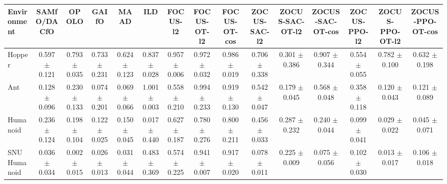 \begin{tabular}{lcccccccccccccc}
\toprule
Environment & SAMfO/DACfO & OPOLO & GAIfO & MAAD & ILD & FOCUS-l2 & FOCUS-OT-l2 & FOCUS-OT-cos & ZOCUS-SAC-l2 & ZOCUS-SAC-OT-l2 & ZOCUS-SAC-OT-cos & ZOCUS-PPO-l2 & ZOCUS-PPO-OT-l2 & ZOCUS-PPO-OT-cos \\
\midrule
Hopper & 0.597 $\pm$ 0.121 & 0.793 $\pm$ 0.035 & 0.733 $\pm$ 0.231 & 0.624 $\pm$ 0.123 & 0.837 $\pm$ 0.028 & 0.957 $\pm$ 0.006 & 0.972 $\pm$ 0.032 & 0.986 $\pm$ 0.019 & 0.706 $\pm$ 0.338 & 0.301 $\pm$ 0.386 & 0.907 $\pm$ 0.344 & 0.554 $\pm$ 0.055 & 0.782 $\pm$ 0.100 & 0.632 $\pm$ 0.198 \\
Ant & 0.128 $\pm$ 0.096 & 0.230 $\pm$ 0.133 & 0.074 $\pm$ 0.201 & 0.069 $\pm$ 0.066 & 1.001 $\pm$ 0.003 & 0.558 $\pm$ 0.210 & 0.994 $\pm$ 0.233 & 0.919 $\pm$ 0.130 & 0.542 $\pm$ 0.047 & 0.179 $\pm$ 0.045 & 0.568 $\pm$ 0.048 & 0.358 $\pm$ 0.118 & 0.120 $\pm$ 0.043 & 0.121 $\pm$ 0.089 \\
Humanoid & 0.236 $\pm$ 0.124 & 0.198 $\pm$ 0.104 & 0.122 $\pm$ 0.025 & 0.150 $\pm$ 0.045 & 0.017 $\pm$ 0.440 & 0.627 $\pm$ 0.187 & 0.780 $\pm$ 0.276 & 0.800 $\pm$ 0.211 & 0.456 $\pm$ 0.033 & 0.287 $\pm$ 0.232 & 0.240 $\pm$ 0.044 & 0.099 $\pm$ 0.041 & 0.029 $\pm$ 0.022 & 0.045 $\pm$ 0.071 \\
SNU Humanoid & 0.036 $\pm$ 0.034 & 0.002 $\pm$ 0.015 & 0.026 $\pm$ 0.013 & 0.031 $\pm$ 0.044 & 0.483 $\pm$ 0.369 & 0.574 $\pm$ 0.225 & 0.941 $\pm$ 0.007 & 0.917 $\pm$ 0.020 & 0.078 $\pm$ 0.011 & 0.225 $\pm$ 0.009 & 0.075 $\pm$ 0.056 & 0.102 $\pm$ 0.030 & 0.013 $\pm$ 0.017 & 0.106 $\pm$ 0.018 \\
\bottomrule
\end{tabular}
